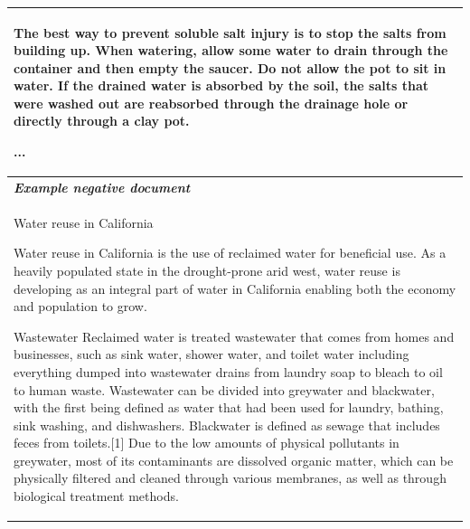 \begin{table}[ht]
\begin{tabular}{p{13cm}}
The best way to prevent soluble salt injury is to stop the salts from building up. When watering, allow some water to drain through the container and then empty the saucer. Do not allow the pot to sit in water. If the drained water is absorbed by the soil, the salts that were washed out are reabsorbed through the drainage hole or directly through a clay pot. 

...\\


\midrule
\textit{\textbf{Example negative document}} \\
\midrule
Water reuse in California

Water reuse in California is the use of reclaimed water for beneficial use. As a heavily populated state in the drought-prone arid west, water reuse is developing as an integral part of water in California enabling both the economy and population to grow.

Wastewater
Reclaimed water is treated wastewater that comes from homes and businesses, such as sink water, shower water, and toilet water including everything dumped into wastewater drains from laundry soap to bleach to oil to human waste. Wastewater can be divided into greywater and blackwater, with the first being defined as water that had been used for laundry, bathing, sink washing, and dishwashers. Blackwater is defined as sewage that includes feces from toilets.[1] Due to the low amounts of physical pollutants in greywater, most of its contaminants are dissolved organic matter, which can be physically filtered and cleaned through various membranes, as well as through biological treatment methods. 


\end{tabular}
\end{table}
